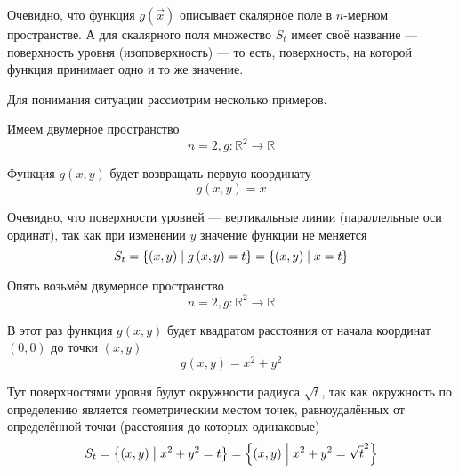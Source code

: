 Очевидно, что функция $g\left( \vec{x} \right)$
описывает скалярное поле в $n$-мерном пространстве.
А для скалярного поля множество $S_t$
имеет своё название --- поверхность уровня (изоповерхность) --- то есть,
поверхность, на которой функция принимает одно и то же значение.

Для понимания ситуации рассмотрим несколько примеров.

\begin{example}
    Имеем двумерное пространство
    $$n=2, g: \mathbb{R}^2 \rightarrow \mathbb{R}$$

    Функция $g\left( x, y \right)$ будет возвращать первую координату
    $$g\left( x, y \right) = x$$

    Очевидно, что поверхности уровней --- вертикальные линии
    (параллельные оси ординат), так как при изменении $y$
    значение функции не меняется
    $$S_t
        = \left\{ \left( x, y \right) \;\middle|\; g\left( x, y \right) = t \right\}
        = \left\{ \left( x, y \right) \;\middle|\; x = t \right\}$$
\end{example}

\begin{example}
    Опять возьмём двумерное пространство
    $$n=2, g: \mathbb{R}^2 \rightarrow \mathbb{R}$$

    В этот раз функция $g\left( x, y \right)$ будет квадратом расстояния
    от начала координат $\left( 0, 0 \right)$ до точки $\left( x, y \right)$
    $$g\left( x, y \right) = x^2 + y^2$$

    Тут поверхностями уровня будут окружности радиуса $\sqrt{t}$,
    так как окружность по определению является геометрическим местом точек,
    равноудалённых от определённой точки (расстояния до которых одинаковые)
    $$S_t
        = \left\{ \left( x, y \right) \;\middle|\; x^2 + y^2 = t \right\}
        = \left\{ \left( x, y \right) \;\middle|\; x^2 + y^2 = \sqrt{t}^2 \right\}$$
\end{example}

